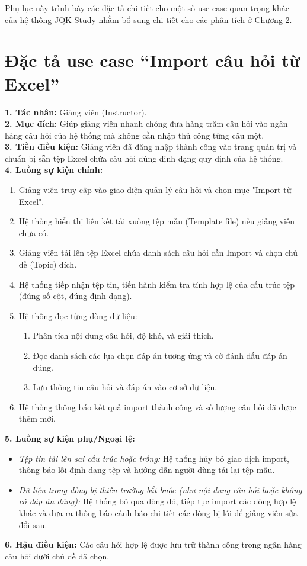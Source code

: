 \documentclass[../DoAn.tex]{subfiles}
\begin{document}
Phụ lục này trình bày các đặc tả chi tiết cho một số use case quan trọng khác của hệ thống JQK Study nhằm bổ sung chi tiết cho các phân tích ở Chương 2.

\section{Đặc tả use case ``Import câu hỏi từ Excel''}
\label{appendix:B.1}

\textbf{1. Tác nhân:} Giảng viên (Instructor). \\
\textbf{2. Mục đích:} Giúp giảng viên nhanh chóng đưa hàng trăm câu hỏi vào ngân hàng câu hỏi của hệ thống mà không cần nhập thủ công từng câu một. \\
\textbf{3. Tiền điều kiện:} Giảng viên đã đăng nhập thành công vào trang quản trị và chuẩn bị sẵn tệp Excel chứa câu hỏi đúng định dạng quy định của hệ thống. \\
\textbf{4. Luồng sự kiện chính:}
\begin{enumerate}
    \item Giảng viên truy cập vào giao diện quản lý câu hỏi và chọn mục "Import từ Excel".
    \item Hệ thống hiển thị liên kết tải xuống tệp mẫu (Template file) nếu giảng viên chưa có.
    \item Giảng viên tải lên tệp Excel chứa danh sách câu hỏi cần Import và chọn chủ đề (Topic) đích.
    \item Hệ thống tiếp nhận tệp tin, tiến hành kiểm tra tính hợp lệ của cấu trúc tệp (đúng số cột, đúng định dạng).
    \item Hệ thống đọc từng dòng dữ liệu:
    \begin{enumerate}
        \item Phân tích nội dung câu hỏi, độ khó, và giải thích.
        \item Đọc danh sách các lựa chọn đáp án tương ứng và cờ đánh dấu đáp án đúng.
        \item Lưu thông tin câu hỏi và đáp án vào cơ sở dữ liệu.
    \end{enumerate}
    \item Hệ thống thông báo kết quả import thành công và số lượng câu hỏi đã được thêm mới.
\end{enumerate}
\textbf{5. Luồng sự kiện phụ/Ngoại lệ:}
\begin{itemize}
    \item \textit{Tệp tin tải lên sai cấu trúc hoặc trống:} Hệ thống hủy bỏ giao dịch import, thông báo lỗi định dạng tệp và hướng dẫn người dùng tải lại tệp mẫu.
    \item \textit{Dữ liệu trong dòng bị thiếu trường bắt buộc (như nội dung câu hỏi hoặc không có đáp án đúng):} Hệ thống bỏ qua dòng đó, tiếp tục import các dòng hợp lệ khác và đưa ra thông báo cảnh báo chi tiết các dòng bị lỗi để giảng viên sửa đổi sau.
\end{itemize}
\textbf{6. Hậu điều kiện:} Các câu hỏi hợp lệ được lưu trữ thành công trong ngân hàng câu hỏi dưới chủ đề đã chọn.
\end{document}
